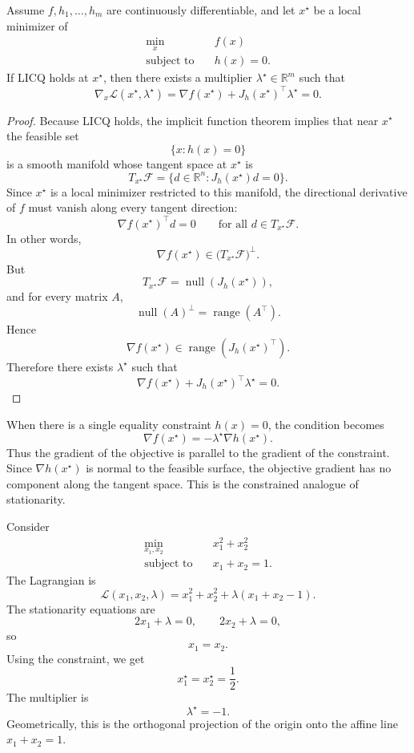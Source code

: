 \begin{theorem}\label{thm:l3-lagrange-multiplier-theorem}
	Assume $f,h_1,\dots,h_m$ are continuously differentiable, and let $x^\star$ be a local minimizer of
	\begin{align*}
		\min_x \quad & f(x) \\
		\text{subject to} \quad & h(x)=0.
	\end{align*}
	If LICQ holds at $x^\star$, then there exists a multiplier $\lambda^\star \in \mathbb{R}^m$ such that
	\[
		\nabla_x \mathcal{L}(x^\star,\lambda^\star)
		=
		\nabla f(x^\star)+J_h(x^\star)^\top \lambda^\star
		=
		0.
	\]
\end{theorem}
\begin{proof}
	Because LICQ holds, the implicit function theorem implies that near $x^\star$ the feasible set
	\[
		\{x : h(x)=0\}
	\]
	is a smooth manifold whose tangent space at $x^\star$ is
	\[
		T_{x^\star}\mathcal{F}
		=
		\{d \in \mathbb{R}^n : J_h(x^\star)d=0\}.
	\]
	Since $x^\star$ is a local minimizer restricted to this manifold, the directional derivative of $f$ must vanish along every tangent direction:
	\[
		\nabla f(x^\star)^\top d = 0
		\qquad \text{for all } d \in T_{x^\star}\mathcal{F}.
	\]
	In other words,
	\[
		\nabla f(x^\star) \in \bigl(T_{x^\star}\mathcal{F}\bigr)^\perp.
	\]
		But
		\[
			T_{x^\star}\mathcal{F}
			=
			\operatorname{null}(J_h(x^\star)),
		\]
		and for every matrix $A$,
		\[
			\operatorname{null}(A)^\perp = \operatorname{range}(A^\top).
		\]
	Hence
	\[
		\nabla f(x^\star) \in \operatorname{range}(J_h(x^\star)^\top).
	\]
	Therefore there exists $\lambda^\star$ such that
	\[
		\nabla f(x^\star)+J_h(x^\star)^\top \lambda^\star = 0.
	\]
\end{proof}

\begin{remark}
	When there is a single equality constraint $h(x)=0$, the condition becomes
	\[
		\nabla f(x^\star) = -\lambda^\star \nabla h(x^\star).
	\]
	Thus the gradient of the objective is parallel to the gradient of the constraint. Since $\nabla h(x^\star)$ is normal to the feasible surface, the objective gradient has no component along the tangent space. This is the constrained analogue of stationarity.
\end{remark}

\begin{eg}
	Consider
	\begin{align*}
		\min_{x_1,x_2} \quad & x_1^2+x_2^2 \\
		\text{subject to}\quad & x_1+x_2=1.
	\end{align*}
	The Lagrangian is
	\[
		\mathcal{L}(x_1,x_2,\lambda)=x_1^2+x_2^2+\lambda(x_1+x_2-1).
	\]
	The stationarity equations are
	\[
		2x_1+\lambda=0,
		\qquad
		2x_2+\lambda=0,
	\]
	so
	\[
		x_1=x_2.
	\]
	Using the constraint, we get
	\[
		x_1^\star=x_2^\star=\frac{1}{2}.
	\]
	The multiplier is
	\[
		\lambda^\star=-1.
	\]
	Geometrically, this is the orthogonal projection of the origin onto the affine line $x_1+x_2=1$.
\end{eg}


